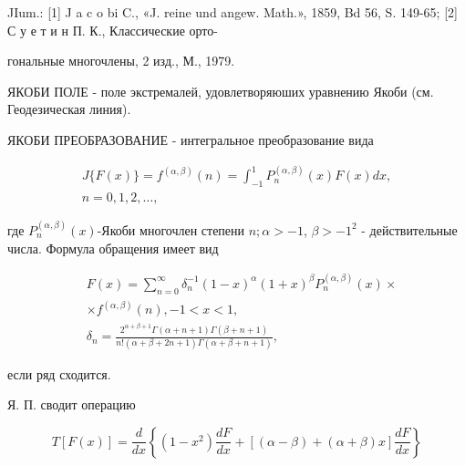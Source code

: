 \documentclass[10pt]{article}
\begin{document}
JIum.: [1] J a c o bi C., «J. reine und angew. Math.», 1859, Bd 56, S. 149-65; [2] С у е т и н П. К., Классические орто-

гональные многочлены, 2 изд., М., 1979.



ЯКОБИ ПОЛЕ - поле экстремалей, удовлетворяюших уравнению Якоби (см. Геодезическая линия).



ЯКОБИ ПРЕОБРАЗОВАНИЕ - интегральное преобразование вида



\[

\begin{gathered}

J\{F(x)\}=f^{(\alpha, \beta)}(n)=\int_{-1}^{1} P_{n}^{(\alpha, \beta)}(x) F(x) d x, \\

n=0,1,2, \ldots,

\end{gathered}

\]



где $P_{n}^{(\alpha, \beta)}(x)$-Якоби многочлен степени $n ; \alpha>-1$, $\beta>-1^{2}$ - действительные числа. Формула обращения имеет вид



\[

\begin{aligned}

& F(x)=\sum_{n=0}^{\infty} \delta_{n}^{-1}(1-x)^{\alpha}(1+x)^{\beta} P_{n}^{(\alpha, \beta)}(x) \times \\

& \times f^{(\alpha, \beta)}(n),-1<x<1 \text {, } \\

& \delta_{n}=\frac{2^{\alpha+\beta+1} \Gamma(\alpha+n+1) \Gamma(\beta+n+1)}{n !(\alpha+\beta+2 n+1) \Gamma(\alpha+\beta+n+1)},

\end{aligned}

\]



если ряд сходится.



Я. П. сводит операцию



\[

T[F(x)]=\frac{d}{d x}\left\{\left(1-x^{2}\right) \frac{d F}{d x}+[(\alpha-\beta)+(\alpha+\beta) x] \frac{d F}{d x}\right\}

\]
\end{document}
